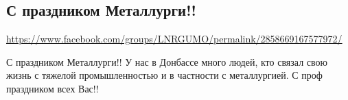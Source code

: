  
 
\subsection{С праздником Металлурги!!}
\label{sec:19_07_2020.fb.lnr.8}
\url{https://www.facebook.com/groups/LNRGUMO/permalink/2858669167577972/}
  
С праздником Металлурги!! У нас в Донбассе много людей, кто связал свою жизнь
с тяжелой промышленностью и в частности с металлургией. С проф праздником всех
Вас!!  

